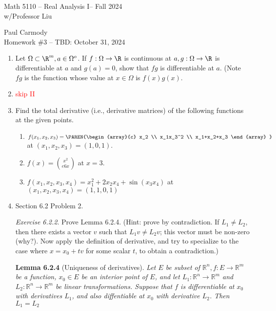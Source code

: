 \documentclass[10pt,a4paper]{report}
\newcommand{\CLASSNAME}{Math 5110 -- Real Analysis I}
\newcommand{\STUDENTNAME}{Paul Carmody}
\newcommand{\ASSIGNMENT}{Homework \#3 }
\newcommand{\DUEDATE}{TBD: October 31, 2024}
\newcommand{\SEMESTER}{Fall 2024}
\newcommand{\RED}[1]{\textcolor{red}{#1}}
\begin{document}
\begin{center}
	\Large{\CLASSNAME -- \SEMESTER} \\
	\large{ w/Professor Liu}
\end{center}
\begin{center}
	\STUDENTNAME \\
	\ASSIGNMENT -- \DUEDATE\\
\end{center} 

\begin{enumerate}[label=\Roman*.]
\item Let $\Omega \subset \R^m, a \in \Omega^o$.  If $f:\Omega \to \R$ is continuous at $a, g: \Omega \to \R$ is differentiable at $a$ and $g(a) = 0$, show that $fg$ is differentiable at $a$.  (Note $fg$ is the function whose value at $x \in \Omega$ is $f(x)g(x)$.

\item \RED{skip II}

\item Find the total derivative (i.e., derivative matrices) of the following functions at the given points.
\begin{enumerate}[label=(\alph*)]
	\item $f(x_1,x_2,x_3) = \PAREN{\begin{array}{c}
		x_2 \\ 
		x_1x_3^2 \\
		x_1+x_2+x_3
	\end{array} }$ at $(x_1,x_2,x_3) = (1,0,1)$.
	
	\item $f(x) = \binom{x^2}{e6x}$ at $x=3$.
	
	\item $f(x_1,x_2,x_3,x_4) = x_1^2+2x_2x_4+\sin(x_3x_4)$ at $(x_1,x_2,x_3,x_4) = (1,1,0,1)$
\end{enumerate}

\item Section 6.2 Problem 2.

	\textit{Exercise 6.2.2}.  Prove Lemma 6.2.4. (Hint: prove by contradiction.  If $L_1 \ne L_2$, then there exists a vector $v$ such that $L_1v \ne L_2v$; this vector must be non-zero (why?).  Now apply the definition of derivative, and try to specialize to the case where $x=x_0+tv$ for some scalar $t$, to obtain a contradiction.)

\newcommand{\RRR}{\mathbb{R}}	
	\textbf{Lemma 6.2.4} (Uniqueness of derivatives).  \textit{Let $E$ be  subset of $\RRR^n, f: E\to \RRR^m$ be a function, $x_0\in E$ be an interior point of $E$, and let $L_1: \RRR^n\to \RRR^m$ and $L_2: \RRR^n\to \RRR^m$ be linear transformations.  Suppose that $f$ is differentiable at $x_0$ with derivatives $L_1$, and also diffentiable at $x_0$ with derivative $L_2$.  Then $L_1=L_2$}
	

\end{enumerate}
\end{document}
